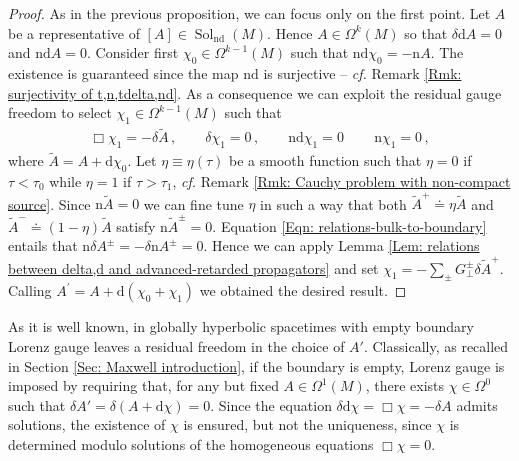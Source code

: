 \begin{proof}
	As in the previous proposition, we can focus only on the first point.
	Let $A$ be a representative of $[A]\in\operatorname{Sol}_{\mathrm{nd}}(M)$. Hence $A\in\Omega^k(M)$ so that $\delta\mathrm{d}A=0$ and $\mathrm{nd}A=0$.
	Consider first $\chi_0\in\Omega^{k-1}(M)$ such that $\mathrm{nd}\chi_0=-\mathrm{n}A$.
	The existence is guaranteed since the map $\mathrm{nd}$ is surjective -- \textit{cf.} Remark \ref{Rmk: surjectivity of t,n,tdelta,nd}.
	As a consequence we can exploit the residual gauge freedom to select $\chi_1\in\Omega^{k-1}(M)$ such that
	\begin{align}\label{Eqn: gauge fixing partial}
	\Box \chi_1=-\delta \widetilde{A}\,,\qquad
	\delta\chi_1=0\,,\qquad
	\mathrm{nd}\chi_1 =0\,\qquad
	\mathrm{n}\chi_1=0\,,
	\end{align}
	where $\widetilde{A}=A+\mathrm{d}\chi_0$.
	Let $\eta\equiv\eta(\tau)$ be a smooth function such that $\eta=0$ if $\tau<\tau_0$ while $\eta=1$ if $\tau>\tau_1$, \textit{cf.} Remark \ref{Rmk: Cauchy problem with non-compact source}.
	Since $\mathrm{n}\widetilde{A}=0$ we can fine tune $\eta$ in such a way that both $\widetilde{A}^+\doteq\eta\widetilde{A}$ and $\widetilde{A}^-\doteq(1-\eta)\widetilde{A}$ satisfy $\mathrm{n}\widetilde{A}^\pm=0$.
	Equation \eqref{Eqn: relations-bulk-to-boundary} entails that $\mathrm{n}\delta A^\pm=-\delta\mathrm{n}A^\pm=0$.
	Hence we can apply Lemma \ref{Lem: relations between delta,d and advanced-retarded propagators} and set $\chi_1=-\sum_\pm G^\pm_\perp\delta\widetilde{A}^+$.
	Calling $A^\prime=A+\mathrm{d}(\chi_0+\chi_1)$ we obtained the desired result.
\end{proof}


As it is well known, in globally hyperbolic spacetimes with empty boundary Lorenz gauge leaves a residual freedom in the choice of $A'$. Classically, as recalled in Section \ref{Sec: Maxwell introduction}, if the boundary is empty, Lorenz gauge is imposed by requiring that, for any but fixed $A\in\Omega^1(M)$, there exists $\chi\in\Omega^{0}$ such that $\delta A'=\delta(A+\mathrm{d}\chi)=0$. Since the equation $\delta\mathrm{d}\chi=\Box\chi=-\delta A$ admits solutions, the existence of $\chi$ is ensured, but not the uniqueness, since $\chi$ is determined modulo solutions of the homogeneous equations $\Box\chi=0$.

